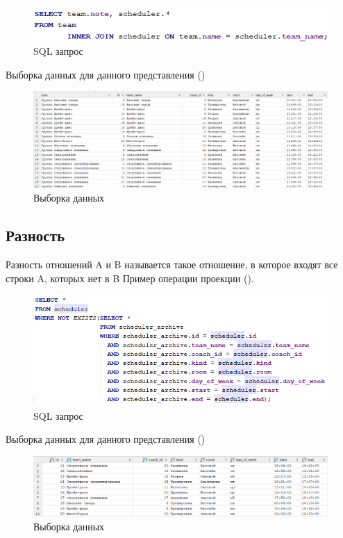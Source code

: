 \documentclass[a4paper,14pt]{article}
\begin{document}
	\begin{figure}[H]
		\centering		
		\includegraphics[width=0.7\linewidth]{image/4_050}
		\caption{SQL запрос}\label{img:4_050}
	\end{figure}
	
	Выборка данных для данного представления ()
	
	\begin{figure}[H]
		\centering		
		\includegraphics[width=0.9\linewidth]{image/4_051}
		\caption{Выборка данных}\label{img:4_051}
	\end{figure}

 \subsection{Разность}

	Разность отношений A и B называется такое отношение, в которое входят все строки A, которых нет в B
	Пример операции проекции ().
	
	\begin{figure}[H]
		\centering		
		\includegraphics[width=0.7\linewidth]{image/4_060}
		\caption{SQL запрос}\label{img:4_060}
	\end{figure}
	
	Выборка данных для данного представления ()
	
	\begin{figure}[H]
		\centering		
		\includegraphics[width=0.9\linewidth]{image/4_061}
		\caption{Выборка данных}\label{img:4_061}
	\end{figure}
\end{document}
